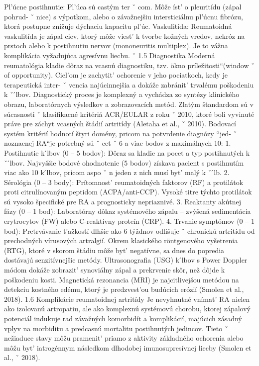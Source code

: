{ Pl’úcne postihnutie: Pl’úca sú castým ter ˇ com. Môže íst’ o pleuritídu (zápal pohrud- ˇ nice) s výpotkom, alebo o závažnejšiu intersticiálnu pl’úcnu fibrózu, ktorá postupne znižuje dýchaciu kapacitu pl’úc.
 Vaskulitída: Reumatoidná vaskulitída je zápal ciev, ktorý môže viest’ k tvorbe kožných vredov, nekróz na prstoch alebo k postihnutiu nervov (mononeuritis multiplex). Je to vážna komplikácia vyžadujúca agresívnu liecbu. ˇ 1.5 Diagnostika Moderná reumatológia kladie dôraz na vcasnú diagnostiku, tzv. ökno príležitosti``(window ˇ of opportunity). Ciel’om je zachytit’ ochorenie v jeho pociatkoch, kedy je terapeutická inter- ˇ vencia najúcinnejšia a dokáže zabránit’ trvalému poškodeniu k ˇ  ́lbov. Diagnostický proces je komplexný a vychádza zo syntézy klinického obrazu, laboratórnych výsledkov a zobrazovacích metód. Zlatým štandardom sú v súcasnosti ˇ klasifikacné kritériá ACR/EULAR z roku ˇ 2010, ktoré boli vyvinuté práve pre záchyt vcasných štádií artritídy (Aletaha et al., ˇ 2010).
 Bodovací systém kritérií hodnotí štyri domény, pricom na potvrdenie diagnózy ``jed- ˇ noznacnej RA``je potrebný sú ˇ cet ˇ 6 a viac bodov z maximálnych 10: 1. Postihnutie k ́lbov (0 – 5 bodov): Dôraz sa kladie na pocet a typ postihnutých k ˇ  ́lbov.
 Najvyššie bodové ohodnotenie (5 bodov) získava pacient s postihnutím viac ako 10 k ́lbov, pricom aspo ˇ n jeden z nich musí byt’ malý k ˇ  ́lb.
 2. Sérológia (0 – 3 body): Prítomnost’ reumatoidných faktorov (RF) a protilátok proti citrulínovaným peptidom (ACPA/anti-CCP). Vysoké titre týchto protilátok sú vysoko špecifické pre RA a prognosticky nepriaznivé.
 3. Reaktanty akútnej fázy (0 – 1 bod): Laboratórny dôkaz systémového zápalu – zvýšená sedimentácia erytrocytov (FW) alebo C-reaktívny proteín (CRP).
 4. Trvanie symptómov (0 – 1 bod): Pretrvávanie t’ažkostí dlhšie ako 6 týždnov odlišuje ˇ chronickú artritídu od prechodných vírusových artralgií.
 Okrem klasického röntgenového vyšetrenia (RTG), ktoré v skorom štádiu môže byt’ negatívne, sa dnes do popredia dostávajú senzitívnejšie metódy. Ultrasonografia (USG) k ́lbov s Power Doppler módom dokáže zobrazit’ synoviálny zápal a prekrvenie skôr, než dôjde k poškodeniu kosti. Magnetická rezonancia (MRI) je najcitlivejšou metódou na detekciu kostného edému, ktorý je predzvest’ou budúcich erózií (Smolen et al., 2018).
 1.6 Komplikácie reumatoidnej artritídy Je nevyhnutné vnímat’ RA nielen ako izolovanú artropatiu, ale ako komplexnú systémovú chorobu, ktorej zápalový potenciál indukuje rad závažných komorbidít a komplikácií, majúcich zásadný vplyv na morbiditu a predcasnú mortalitu postihnutých jedincov. Tieto ˇ nežiaduce stavy môžu pramenit’ priamo z aktivity základného ochorenia alebo môžu byt’ iatrogénnym následkom dlhodobej imunosupresívnej liecby (Smolen et al., ˇ 2018).
}
